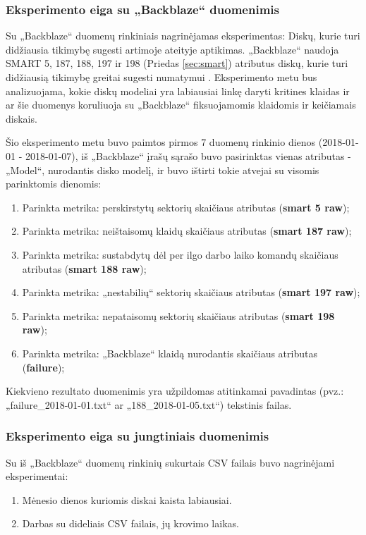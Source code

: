 \documentclass{VUMIFPSkursinis}
\begin{document}
\subsubsection{Eksperimento eiga su „Backblaze“ duomenimis}
Su „Backblaze“ duomenų rinkiniais nagrinėjamas eksperimentas: Diskų, kurie turi didžiausia tikimybę sugesti artimoje ateityje aptikimas. „Backblaze“ naudoja SMART 5, 187, 188, 197 ir 198 (Priedas \ref{sec:smart}) atributus diskų, kurie turi didžiausią tikimybę greitai sugesti numatymui \cite{backblaze_failure}. Eksperimento metu bus analizuojama, kokie diskų modeliai yra labiausiai linkę daryti kritines klaidas ir ar šie duomenys koruliuoja su „Backblaze“ fiksuojamomis klaidomis ir keičiamais diskais.\par

Šio eksperimento metu buvo paimtos pirmos 7 duomenų rinkinio dienos (2018-01-01 - 2018-01-07), iš „Backblaze“ įrašų sąrašo buvo pasirinktas vienas atributas - „Model“, nurodantis disko modelį, ir buvo ištirti tokie atvejai su visomis parinktomis dienomis:
\begin{enumerate}
\item Parinkta metrika: perskirstytų sektorių skaičiaus atributas (\textbf{smart 5 raw});
\item Parinkta metrika: neištaisomų klaidų skaičiaus atributas (\textbf{smart 187 raw});
\item Parinkta metrika: sustabdytų dėl per ilgo darbo laiko komandų skaičiaus atributas (\textbf{smart 188 raw});
\item Parinkta metrika: „nestabilių“ sektorių skaičiaus atributas (\textbf{smart 197 raw});
\item Parinkta metrika: nepataisomų sektorių skaičiaus atributas (\textbf{smart 198 raw});
\item Parinkta metrika: „Backblaze“ klaidą nurodantis skaičiaus atributas (\textbf{failure});
\end{enumerate}
Kiekvieno rezultato duomenimis yra užpildomas atitinkamai pavadintas (pvz.: „failure\_2018-01-01.txt“ ar „188\_2018-01-05.txt“) tekstinis failas.

\subsubsection{Eksperimento eiga su jungtiniais duomenimis}
Su iš „Backblaze“ duomenų rinkinių sukurtais CSV failais buvo nagrinėjami eksperimentai:
\begin{enumerate}
\item Mėnesio dienos kuriomis diskai kaista labiausiai.
\item Darbas su dideliais CSV failais, jų krovimo laikas.
\end{enumerate}
\end{document}
